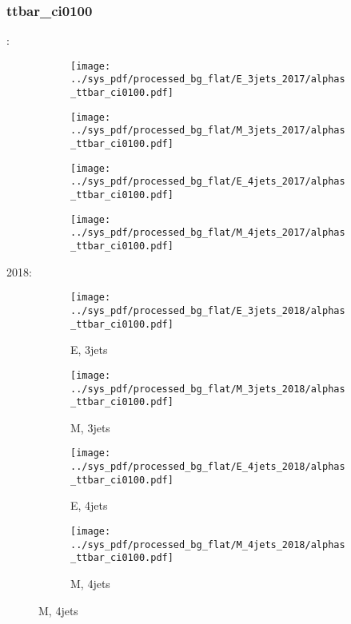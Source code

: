 \documentclass{beamer}
\begin{document}
\begin{frame}
\frametitle{ttbar_ci0100}
\fontsize{5}{1}:
\begin{figure}
\centering
\begin{subfigure}[b]{0.24\textwidth}
\texttt{[image: ../sys\_pdf/processed\_bg\_flat/E\_3jets\_2017/alphas\_ttbar\_ci0100.pdf]}
\end{subfigure}
\begin{subfigure}[b]{0.24\textwidth}
\texttt{[image: ../sys\_pdf/processed\_bg\_flat/M\_3jets\_2017/alphas\_ttbar\_ci0100.pdf]}
\end{subfigure}
\begin{subfigure}[b]{0.24\textwidth}
\texttt{[image: ../sys\_pdf/processed\_bg\_flat/E\_4jets\_2017/alphas\_ttbar\_ci0100.pdf]}
\end{subfigure}
\begin{subfigure}[b]{0.24\textwidth}
\texttt{[image: ../sys\_pdf/processed\_bg\_flat/M\_4jets\_2017/alphas\_ttbar\_ci0100.pdf]}
\end{subfigure}
\end{figure}
2018:
\begin{figure}
\centering
\begin{subfigure}[b]{0.24\textwidth}
\texttt{[image: ../sys\_pdf/processed\_bg\_flat/E\_3jets\_2018/alphas\_ttbar\_ci0100.pdf]}
\captionsetup{font=tiny}
\caption{E, 3jets}
\end{subfigure}
\begin{subfigure}[b]{0.24\textwidth}
\texttt{[image: ../sys\_pdf/processed\_bg\_flat/M\_3jets\_2018/alphas\_ttbar\_ci0100.pdf]}
\captionsetup{font=tiny}
\caption{M, 3jets}
\end{subfigure}
\begin{subfigure}[b]{0.24\textwidth}
\texttt{[image: ../sys\_pdf/processed\_bg\_flat/E\_4jets\_2018/alphas\_ttbar\_ci0100.pdf]}
\captionsetup{font=tiny}
\caption{E, 4jets}
\end{subfigure}
\begin{subfigure}[b]{0.24\textwidth}
\texttt{[image: ../sys\_pdf/processed\_bg\_flat/M\_4jets\_2018/alphas\_ttbar\_ci0100.pdf]}
\captionsetup{font=tiny}
\caption{M, 4jets}
\end{subfigure}
\end{figure}
\end{frame}
\end{document}
